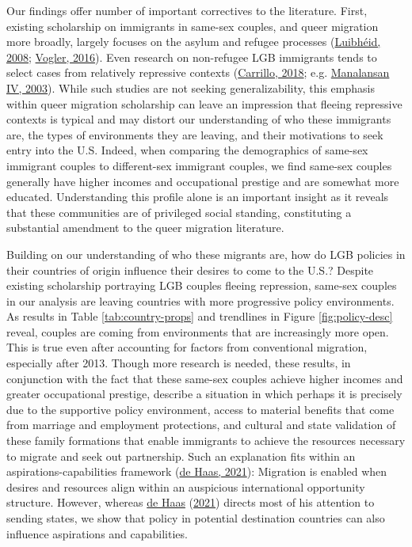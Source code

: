 \documentclass[
  12pt,
]{article}
\begin{document}
Our findings offer number of important correctives to the literature. First, existing scholarship on immigrants in same-sex couples, and queer migration more broadly, largely focuses on the asylum and refugee processes (\protect\hyperlink{ref-luibheid_2008}{Luibhéid, 2008}; \protect\hyperlink{ref-vogler_2016}{Vogler, 2016}). Even research on non-refugee LGB immigrants tends to select cases from relatively repressive contexts (\protect\hyperlink{ref-carrillo_2018}{Carrillo, 2018}; e.g. \protect\hyperlink{ref-manalansaniv_2003}{Manalansan IV, 2003}). While such studies are not seeking generalizability, this emphasis within queer migration scholarship can leave an impression that fleeing repressive contexts is typical and may distort our understanding of who these immigrants are, the types of environments they are leaving, and their motivations to seek entry into the U.S. Indeed, when comparing the demographics of same-sex immigrant couples to different-sex immigrant couples, we find same-sex couples generally have higher incomes and occupational prestige and are somewhat more educated. Understanding this profile alone is an important insight as it reveals that these communities are of privileged social standing, constituting a substantial amendment to the queer migration literature.

Building on our understanding of who these migrants are, how do LGB policies in their countries of origin influence their desires to come to the U.S.? Despite existing scholarship portraying LGB couples fleeing repression, same-sex couples in our analysis are leaving countries with more progressive policy environments. As results in Table \ref{tab:country-props} and trendlines in Figure \ref{fig:policy-desc} reveal, couples are coming from environments that are increasingly more open. This is true even after accounting for factors from conventional migration, especially after 2013. Though more research is needed, these results, in conjunction with the fact that these same-sex couples achieve higher incomes and greater occupational prestige, describe a situation in which perhaps it is precisely due to the supportive policy environment, access to material benefits that come from marriage and employment protections, and cultural and state validation of these family formations that enable immigrants to achieve the resources necessary to migrate and seek out partnership. Such an explanation fits within an aspirations-capabilities framework (\protect\hyperlink{ref-dehaas_2021}{de Haas, 2021}): Migration is enabled when desires and resources align within an auspicious international opportunity structure. However, whereas \protect\hyperlink{ref-dehaas_2021}{de Haas} (\protect\hyperlink{ref-dehaas_2021}{2021}) directs most of his attention to sending states, we show that policy in potential destination countries can also influence aspirations and capabilities.
\end{document}
